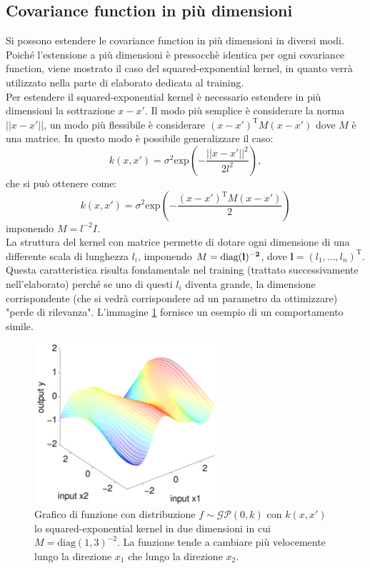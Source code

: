 \subsection{Covariance function in più dimensioni}\label{multidimensionalKernel}
Si possono estendere le covariance function in più dimensioni in diversi modi. Poiché l'estensione a più dimensioni è pressocchè identica per ogni covariance function, viene mostrato il caso del squared-exponential kernel, in quanto verrà utilizzato nella parte di elaborato dedicata al training.\\
Per estendere il squared-exponential kernel è necessario estendere in più dimensioni la sottrazione $x-x'$. Il modo più semplice è considerare la norma $||x-x'||$, un modo più flessibile è considerare $(x-x')^\text{T}M(x-x')$ dove $M$ è una matrice.
In questo modo è possibile generalizzare il caso:
\[
k(x,x')=\sigma^2 \text{exp}\left( -\frac{||x-x'||^2}{2l^2} \right),
\]
che si può ottenere come:
\[
k(x,x')=\sigma^2 \text{exp}\left( -\frac{(x-x')^\text{T}M(x-x')}{2} \right)
\]
imponendo $M=l^{-2}I$.\\
La struttura del kernel con matrice permette di dotare ogni dimensione di una differente scala di lunghezza $l_i$, imponendo $M=\text{diag}(\bf{l})^{-2}$, dove $\mathbf{l}=(l_1,...,l_n)^\text{T}$. Questa caratteristica risulta fondamentale nel training (trattato successivamente nell'elaborato) perché se uno di questi $l_i$ diventa grande, la dimensione corrispondente (che si vedrà corrispondere ad un parametro da ottimizzare) "perde di rilevanza". L'immagine \ref{multidimensional} fornisce un esempio di un comportamento simile.

\begin{figure}[h]
    \centering
    \includegraphics[width=0.6\textwidth]{images/Gaussian process/Multidimensional RBF.pdf}
    \caption{Grafico di funzione con distribuzione $f\sim \mathcal{GP}(0,k)$ con $k(x,x')$ lo squared-exponential kernel in due dimensioni in cui $M=\text{diag}(1,3)^{-2}$. La funzione tende a cambiare più velocemente lungo la direzione $x_1$ che lungo la direzione $x_2$. \cite{murphy_machine_2012}}
    \label{multidimensional}
\end{figure}




